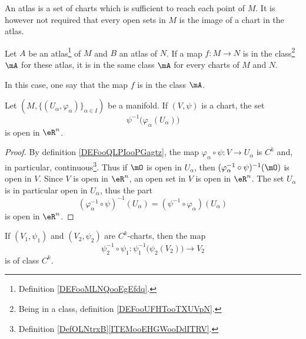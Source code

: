\begin{normaltext}
	An atlas is a set of charts which is sufficient to reach each point of \( M\). It is however not required that every open sets in \( M\) is the image of a chart in the atlas.
\end{normaltext}

\begin{propositionDef}          \label{PROPooUFGQooACIjVL}
	Let \( A\) be an atlas\footnote{Definition \ref{DEFooMLNQooEgEfdq}.} of \( M\) and \( B\) an atlas of \( N\). If a map \( f\colon M\to N\) is in the class\footnote{Being in a class, definition \ref{DEFooUFHTooTXUVpN}.} \( \mA\) for these atlas, it is in the same class \( \mA\) for every charts of \( M\) and \( N\).

	In this case, one say that the map \( f\) is in the class \( \mA\).
\end{propositionDef}

\begin{lemma}       \label{LEMooGAMVooIWUzmy}
	Let \( (M,\{ (U_{\alpha}, \varphi_{\alpha}) \}_{\alpha\in I}) \) be a manifold. If \( (V,\psi)\) is a chart, the set
	\begin{equation}
		\psi^{-1}\big(\varphi_{\alpha}(U_{\alpha})\big)
	\end{equation}
	is open in \(\eR^n\).
\end{lemma}

\begin{proof}
	By definition \ref{DEFooQLPIooPGagtz}, the map \( \varphi_{\alpha}\circ \psi \colon V\to U_{\alpha}\) is \( C^k\) and, in particular, continuous\footnote{Definition \ref{DefOLNtrxB}\ref{ITEMooEHGWooDdITRV}.}. Thus if \( \mO\) is open in \( U_{\alpha}\), then \( (\varphi_{\alpha}^{-1}\circ\psi)^{-1}(\mO)\) is open in \( V\). Since \( V\) is open in \( \eR^n\), an open set in \( V\) is open in \( \eR^n\). The set \( U_{\alpha}\) is in particular open in \( U_{\alpha}\), thus the part
	\begin{equation}
		(\varphi_{\alpha}^{-1}\circ \psi)^{-1}(U_{\alpha})=(\psi^{-1}\circ\varphi_{\alpha})(U_{\alpha})
	\end{equation}
	is open in \( \eR^n\).
\end{proof}

\begin{proposition}      \label{PROPooUDVFooEJeluM}
	If \( (V_1,\psi_1)\) and \( (V_2,\psi_2)\) are \( C^k\)-charts, then the map
	\begin{equation}
		\psi_2^{-1}\circ \psi_1\colon \psi_1^{-1}\big( \psi_2(V_2) \big)\to V_2
	\end{equation}
	is of class \( C^k\).
\end{proposition}

